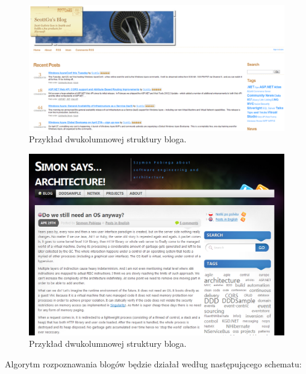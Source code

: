 \documentclass[a4paper,10pt]{article}
\begin{document}
\begin{figure}[h!]
\centering
  \includegraphics[width=.9\textwidth]{blog_scott.png}
  \caption{Przykład dwukolumnowej struktury bloga.}
  \label{fig:blog_scott}
\end{figure}

\begin{figure}[h!]
\centering
  \includegraphics[width=.9\textwidth]{blog_simon.png}
  \caption{Przykład dwukolumnowej struktury bloga.}
  \label{fig:blog_simon}
\end{figure}

Algorytm rozpoznawania blogów będzie działał według następującego schematu:
\end{document}
